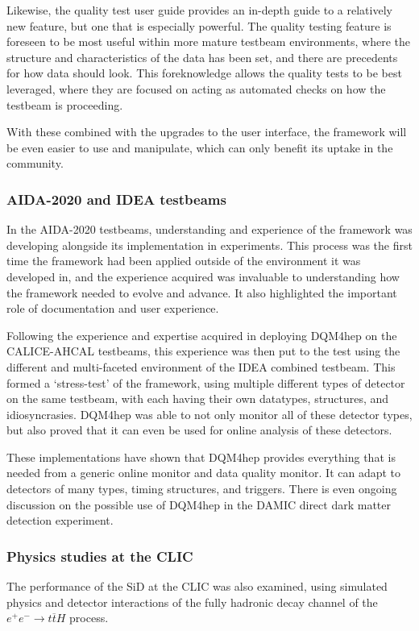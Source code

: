 Likewise, the quality test user guide provides an in-depth guide to a relatively new feature, but one that is especially powerful. The quality testing feature is foreseen to be most useful within more mature testbeam environments, where the structure and characteristics of the data has been set, and there are precedents for how data should look. This foreknowledge allows the quality tests to be best leveraged, where they are focused on acting as automated checks on how the testbeam is proceeding.

With these combined with the upgrades to the user interface, the framework will be even easier to use and manipulate, which can only benefit its uptake in the community.

\subsubsection*{\acrshort{AIDA}-2020 and IDEA testbeams}
In the \acrshort{AIDA}-2020 testbeams, understanding and experience of the framework was developing alongside its implementation in experiments. This process was the first time the framework had been applied outside of the environment it was developed in, and the experience acquired was invaluable to understanding how the framework needed to evolve and advance. It also highlighted the important role of documentation and user experience.

Following the experience and expertise acquired in deploying \acrshort{DQM4hep} on the \acrshort{CALICE}-\acrshort{AHCAL} testbeams, this experience was then put to the test using the different and multi-faceted environment of the \acrshort{IDEA} combined testbeam. This formed a `stress-test' of the framework, using multiple different types of detector on the same testbeam, with each having their own datatypes, structures, and idiosyncrasies. \acrshort{DQM4hep} was able to not only monitor all of these detector types, but also proved that it can even be used for online analysis of these detectors.

These implementations have shown that \acrshort{DQM4hep} provides everything that is needed from a generic online monitor and data quality monitor. It can adapt to detectors of many types, timing structures, and triggers. There is even ongoing discussion on the possible use of \acrshort{DQM4hep} in the \acrshort{DAMIC} direct dark matter detection experiment. 

\subsubsection*{Physics studies at the \acrlong{CLIC}}
The performance of the \acrshort{SiD} at the \acrlong{CLIC} was also examined, using simulated physics and detector interactions of the fully hadronic decay channel of the $e^+ e^- \rightarrow t \overline{t} H$ process. 

